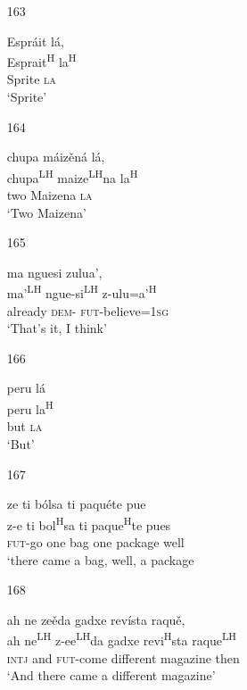 \begin{itemize}
\item[163]
 
\glll   Espr\'{a}it l\'{a},\\
 Esprait\textsuperscript{H} la\textsuperscript{H}\\
Sprite \textsc{la}\\
\glt `Sprite'
 


\item[164]
 
\glll   chupa m\'{a}iz\v{e}n\'{a} l\'{a},\\
chupa\textsuperscript{LH} maize\textsuperscript{LH}na la\textsuperscript{H}\\
two Maizena \textsc{la}\\
\glt `Two Maizena'
 


\item[165]
 
\glll   ma nguesi zulua',\\
 ma'\textsuperscript{LH} ngue-si\textsuperscript{LH}  z-ulu=a'\textsuperscript{H}\\
already \textsc{dem}- \textsc{fut}-believe=\textsc{1sg}\\
\glt `That's it, I think'
 


\item[166]
 
\glll   peru l\'{a}\\
peru la\textsuperscript{H}\\
but \textsc{la}\\
\glt `But'
 


\item[167]
 
\glll  ze ti b\'{o}lsa ti paqu\'{e}te pue\\
z-e ti bol\textsuperscript{H}sa ti paque\textsuperscript{H}te pues\\
\textsc{fut}-go one bag one package well \\
\glt `there came a bag, well, a package
 



\item[168]
 
\glll   ah ne ze\v{e}da gadxe rev\'{i}sta raqu\v{e}, \\
ah ne\textsuperscript{LH} z-ee\textsuperscript{LH}da gadxe revi\textsuperscript{H}sta raque\textsuperscript{LH}\\
\textsc{intj} and \textsc{fut}-come different magazine then\\
\glt `And there came a different magazine'
 



\end{itemize}
